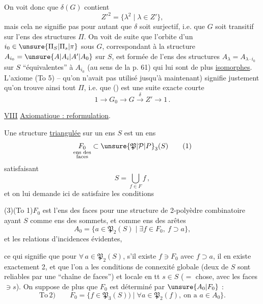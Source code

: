 

On voit donc que $\delta(G)$ contient 
\[
Z'^{2}=\{\lambda^2\mid\lambda\in Z'\},
\]
mais cela ne signifie pas pour autant que $\delta$ soit surjectif, i.e. que $G$ soit transitif sur l'ens des structures $\Pi$. On voit de suite que l'orbite d'un $i_0\in\unsure{\Pi_S|\Pi_s|\pi}$ sous $G$, correspondant à la structure $A_{i_0}=\unsure{A|A_i|A'|A_0}$ sur $S$, est formée de l'ens des structures $A_\lambda=A_{\lambda\cdot i_0}$ sur $S$ ``équivalentes'' à $A_{i_0}$ (au sens de la p. 61) qui lui sont de plus \uline{isomorphes}. L'axiome (To 5) -- qu'on n'avait pas utilisé jusqu'à maintenant) signifie justement qu'on trouve ainsi tout  $\Pi$, i.e. que () est une suite exacte courte
\[
1\longrightarrow G_0\longrightarrow G\xrightarrow{\delta}Z'\longrightarrow 1\,.\tag*{(63)}
\]


\uline{VIII} \uline{Axiomatique : reformulation}.

Une structure \uline{triangulée} sur un ens $S$ est un ens
\[
\underset{\substack{\text{ens des}\\\text{faces}}}{F_0}\subset\unsure{\mathfrak{P}|\mathcal{P}|P}_3(S)\tag*{(1)}
\]
satisfaisant
\[
S=\bigcup_{f\in F}f\,,\tag*{(2)}
\]
et on lui demande ici de satisfaire les conditions

(3)\qquad (To 1)\qquad $F_0$ est l'ens des faces pour une structure de 2-polyèdre  combinatoire  ayant $S$ comme ens des sommets, et comme ens des arêtes
\[
A_0=\{a\in\mathfrak{P}_2(S)\mid\exists f\in F_0,\ f\supset a\},
\]
et les relations d'incidences évidentes,

ce qui signifie que pour $\forall\,a\in\mathfrak{P}_2(S)$, s'il existe $f\ni F_0$ avec $f\supset a$, il en existe exactement 2, et que l'on a les conditions de connexité globale (deux  de $S$ sont reliables par une ``chaîne de faces'') et locale en tt $s\in S$ ($=$ chose, avec les faces $\ni s$). On suppose de plus que $F_0$ est déterminé par $\unsure{A_0|F_0}$ :
\[
\mathrm{To}\,2)\qquad F_0=\{f\in\mathfrak{P}_3(S))\mid\forall a\in\mathfrak{P}_2(f),\ \text{on a }a\in A_0\}.\tag*{(4)}
\]

